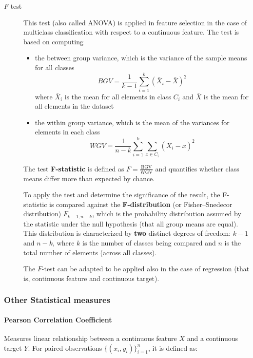 \begin{description}
\item[$F$ test] This test (also called ANOVA) is applied in feature selection in the case of multiclass classification with respect to a continuous feature. 
The test is based on computing 
\begin{itemize}
\item the between group variance, which is the variance of the sample means for all classes
\[
BGV = \frac{1}{k-1}\sum_{i=1}^k(\bar{X}_i-\bar{X})^2
\]
where $\bar{X}_i$ is the mean for all elements in class $C_i$ and $\bar{X}$ is the mean for all elements in the dataset
\item  the within group variance, which is the mean of the variances for elements in each class
\[
WGV = \frac{1}{n-k}\sum_{i=1}^k\sum_{x\in C_i}(\bar{X}_i-x)^2
\]
\end{itemize}

The test \textbf{F-statistic} is defined as $F = \frac{\text{BGV}}{\text{WGV}}$ and quantifies whether class means differ more than expected by chance. 

To apply the test and determine the significance of the result, the F-statistic is compared against the \textbf{F-distribution} (or Fisher--Snedecor distribution) $F_{k-1, n-k}$, which is the probability distribution assumed by the statistic under the null hypothesis (that all group means are equal).
This distribution is characterized by \textbf{two} distinct degrees of freedom: $k-1$ and $n-k$, where 
$k$ is the number of classes being compared and 
$n$ is the total number of elements (across all classes).

The $F$-test can be adapted to be applied also in the case of regression (that is, continuous feature and continuous target).
\end{description}
\subsubsection*{Other Statistical measures}
\paragraph{Pearson Correlation Coefficient}

Measures linear relationship between a continuous feature $X$ and a continuous target $Y$.
For paired observations $\{(x_i, y_i)\}_{i=1}^n$, it is defined as:

